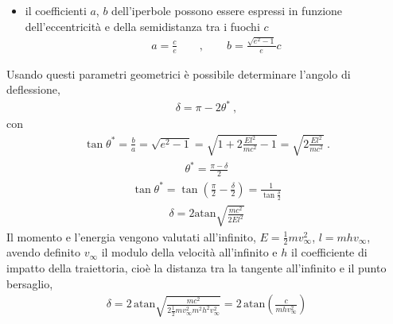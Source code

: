 \documentclass[letterpaper,10pt,italian]{jupyterBook}
\begin{document}
\begin{itemize}
\item {} 
\sphinxAtStartPar
il coefficienti \(a\), \(b\) dell’iperbole possono essere espressi in funzione dell’eccentricità e della semi\sphinxhyphen{}distanza tra i fuochi \(c\)
\begin{equation*}
\begin{split}a = \frac{c}{e} \qquad , \qquad b = \frac{\sqrt{e^2-1}}{e} c\end{split}
\end{equation*}
\end{itemize}

\sphinxAtStartPar
Usando questi parametri geometrici è possibile determinare l’angolo di deflessione,
\begin{equation*}
\begin{split}\delta = \pi - 2 \theta^* \ ,\end{split}
\end{equation*}
\sphinxAtStartPar
con
\begin{equation*}
\begin{split}\tan \theta^* = \frac{b}{a} = \sqrt{e^2-1} = \sqrt{1 + 2 \frac{E l^2}{m c^2} - 1} = \sqrt{2 \frac{E l^2}{m c^2}} \ . \end{split}
\end{equation*}\begin{equation*}
\begin{split}\theta^* = \frac{\pi - \delta}{2}\end{split}
\end{equation*}\begin{equation*}
\begin{split}\tan \theta^* = \tan\left( \frac{\pi}{2} - \frac{\delta}{2} \right) = \frac{1}{\tan \frac{\delta}{2} } \end{split}
\end{equation*}\begin{equation*}
\begin{split}\delta = 2 \text{atan} \sqrt{ \frac{m c^2}{2 E l^2} }\end{split}
\end{equation*}
\sphinxAtStartPar
Il momento e l’energia vengono valutati all’infinito, \(E = \frac{1}{2} m v_{\infty}^2\), \(l = m h v_{\infty}\), avendo definito \(v_{\infty}\) il modulo della velocità all’infinito e \(h\) il coefficiente di impatto della traiettoria, cioè la distanza tra la tangente all’infinito e il punto bersaglio,
\begin{equation*}
\begin{split}\delta = 2 \, \text{atan} \sqrt{ \frac{m c^2}{2 \frac{1}{2} m v_{\infty}^2 m^2 h^2 v_{\infty}^2} } = 2 \, \text{atan} \left( \frac{c}{m h v_{\infty}^2} \right) \end{split}
\end{equation*}
\end{document}
